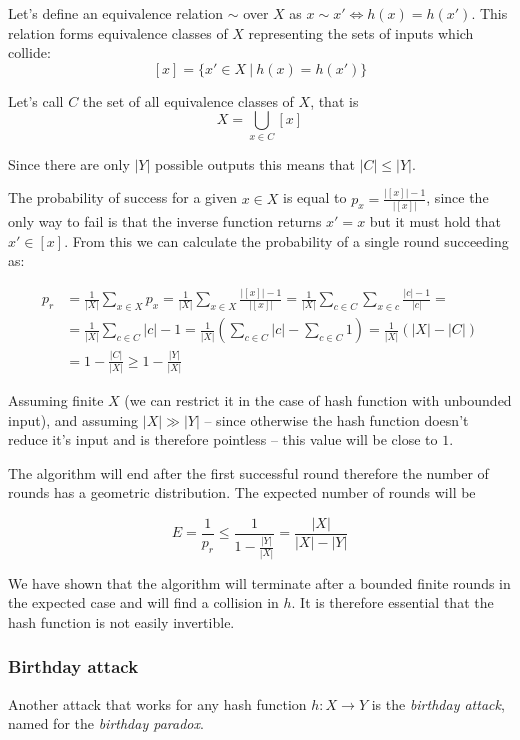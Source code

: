 Let's define an equivalence relation $\sim$ over $X$ as $x \sim x' \Leftrightarrow h(x) = h(x')$. 
This relation forms equivalence classes of $X$ representing the sets of inputs which collide:
\[
[x] = \{x' \in X ~|~ h(x) = h(x')\}
\]

Let's call $C$ the set of all equivalence classes of $X$, that is
\[
X = \bigcup_{x \in C} [x]
\]

Since there are only $|Y|$ possible outputs this means that $|C|\le|Y|$. 

The probability of success for a given $x \in X$ is equal to $p_x = \frac{|[x]| - 1}{|[x]|}$, since the only way to fail is that the inverse function returns $x' = x$ but it must hold that $x' \in [x]$.
From this we can calculate the probability of a single round succeeding as:

\begin{align*}
p_r &= \frac{1}{|X|}\sum_{x\in X} p_x = \frac{1}{|X|}\sum_{x\in X} \frac{|[x]| - 1}{|[x]|} = \frac{1}{|X|}\sum_{c\in C}\sum_{x\in c}\frac{|c| - 1}{|c|} = \\
&= \frac{1}{|X|}\sum_{c\in C} |c| - 1 = \frac{1}{|X|}\left(\sum_{c\in C} |c| - \sum_{c\in C}1\right) = \frac{1}{|X|}\left(|X| - |C|\right)\\
&=1 - \frac{|C|}{|X|} \ge 1 - \frac{|Y|}{|X|}
\end{align*}

Assuming finite $X$ (we can restrict it in the case of hash function with unbounded input), and assuming $|X| \gg |Y|$ -- since otherwise the hash function doesn't reduce it's input and is therefore pointless -- this value will be close to $1$.

The algorithm will end after the first successful round therefore the number of rounds has a geometric distribution.
The expected number of rounds will be

\[
E = \frac{1}{p_r} \le \frac{1}{1-\frac{|Y|}{|X|}} = \frac{|X|}{|X|-|Y|}
\]

We have shown that the algorithm will terminate after a bounded finite rounds in the expected case and will find a collision in $h$.
It is therefore essential that the hash function is not easily invertible.

\subsubsection{Birthday attack}
Another attack that works for any hash function $h: X \to Y$ is the \emph{birthday attack}, named for the \emph{birthday paradox}.

